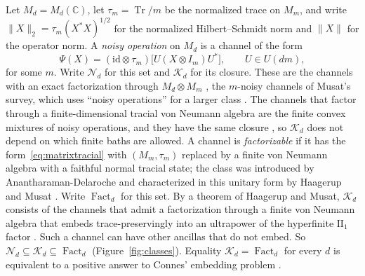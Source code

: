 \documentclass[11pt]{article}
\newcommand{\Tr}{\operatorname{Tr}}
\newcommand{\Fact}{\operatorname{Fact}}
\newcommand{\K}{\mathcal K}
\newcommand{\N}{\mathcal N}
\begin{document}
Let $M_d=M_d(\mathbb C)$, let $\tau_m=\Tr/m$ be the normalized trace on $M_m$, and write $\|X\|_2=\tau_m(X^*X)^{1/2}$ for the normalized Hilbert--Schmidt norm and $\|X\|$ for the operator norm.  A \emph{noisy operation} on $M_d$ is a channel of the form
\begin{equation}\label{eq:matrixtracial}
 \Psi(X)=(\mathrm{id}\otimes\tau_m)\bigl[U(X\otimes I_m)U^*\bigr],\qquad U\in U(dm),
\end{equation}
for some $m$.  Write $\N_d$ for this set and $\K_d$ for its closure.  These are the channels with an exact factorization through $M_d\otimes M_m$ \cite[Definition~3.1]{HaagerupMusat15}, the $m$-noisy channels of Musat's survey, which uses ``noisy operations'' for a larger class \cite{Musat25}.  The channels that factor through a finite-dimensional tracial von Neumann algebra are the finite convex mixtures of noisy operations, and they have the same closure \cite[Proposition~3.8(ii)]{Musat25}, so $\K_d$ does not depend on which finite baths are allowed.  A channel is \emph{factorizable} if it has the form~\eqref{eq:matrixtracial} with $(M_m,\tau_m)$ replaced by a finite von Neumann algebra with a faithful normal tracial state; the class was introduced by Anantharaman-Delaroche \cite[Definition~6.2]{Anantharaman06} and characterized in this unitary form by Haagerup and Musat \cite[Theorem~2.2]{HaagerupMusat11}.  Write $\Fact_d$ for this set.  By a theorem of Haagerup and Musat, $\K_d$ consists of the channels that admit a factorization through a finite von Neumann algebra that embeds trace-preservingly into an ultrapower of the hyperfinite $\mathrm{II}_1$ factor \cite[Theorem~3.6]{HaagerupMusat15}.  Such a channel can have other ancillas that do not embed.  So $\N_d\subseteq\K_d\subseteq\Fact_d$ (Figure~\ref{fig:classes}).  Equality $\K_d=\Fact_d$ for every $d$ is equivalent to a positive answer to Connes' embedding problem \cite[Theorem~3.7]{HaagerupMusat15}.
\end{document}
